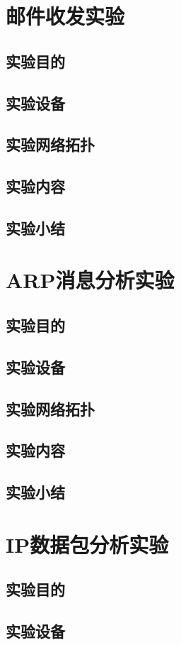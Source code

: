 \documentclass[lang=cn,11pt,a4paper,cite=authoryear]{elegantpaper}
\begin{document}
\section{邮件收发实验}
\subsection{实验目的}
\subsection{实验设备}
\subsection{实验网络拓扑}
\subsection{实验内容}
\subsection{实验小结}
\section{ARP消息分析实验}
\subsection{实验目的}
\subsection{实验设备}
\subsection{实验网络拓扑}
\subsection{实验内容}
\subsection{实验小结}
\section{IP数据包分析实验}
\subsection{实验目的}
\subsection{实验设备}
\end{document}
